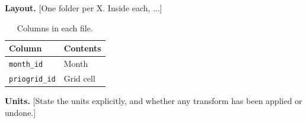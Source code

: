 %
%

\textbf{Layout.} [One folder per X. Inside each, ...]

\begin{table}[h!]
\centering
\renewcommand{\arraystretch}{1.2}
\caption{Columns in each file.}
\label{tab:columns}
\begin{tabular}{@{}p{4.5cm}p{9cm}@{}}
\toprule
\textbf{Column} & \textbf{Contents} \\ \midrule
\texttt{month\_id}    & Month \\
\texttt{priogrid\_id} & Grid cell \\
\bottomrule
\end{tabular}
\end{table}

\textbf{Units.} [State the units explicitly, and whether any transform
has been applied or undone.]
